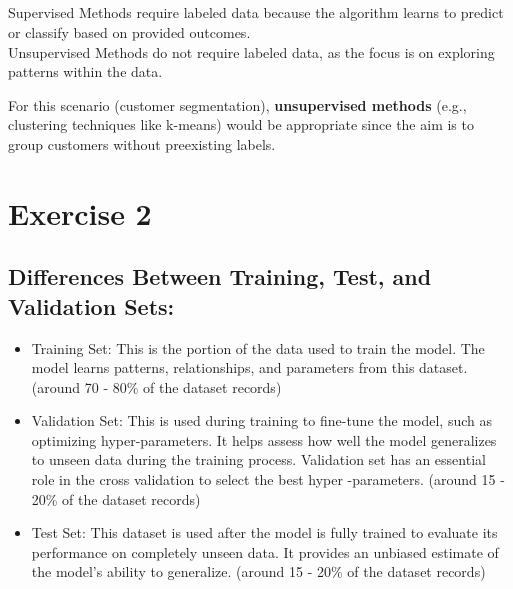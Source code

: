 \documentclass[12pt]{article}
\begin{document}
	\subsection{}	
	
	Supervised Methods require labeled data because the algorithm learns to predict or classify based on provided outcomes.\\
	Unsupervised Methods do not require labeled data, as the focus is on exploring patterns within the data.

	For this scenario (customer segmentation), \textbf{unsupervised methods} (e.g., clustering techniques like k-means) would be appropriate since the aim is to group customers without preexisting labels.

	\section{Exercise 2}
	\subsection{Differences Between Training, Test, and Validation Sets:}
	\begin{itemize}
		\item Training Set: This is the portion of the data used to train the model. The model learns patterns, relationships, and parameters from this dataset. (around 70 - 80\% of the dataset records)
		
		\item Validation Set: This is used during training to fine-tune the model, such as optimizing hyper-parameters. It helps assess how well the model generalizes to unseen data during the training process. Validation set has an essential role in the cross validation to select the best hyper -parameters. (around 15 - 20\% of the dataset records)
		
		\item Test Set: This dataset is used after the model is fully trained to evaluate its performance on completely unseen data. It provides an unbiased estimate of the model's ability to generalize. (around 15 - 20\% of the dataset records)
	\end{itemize}	


	\subsection{}	
	
\end{document}
